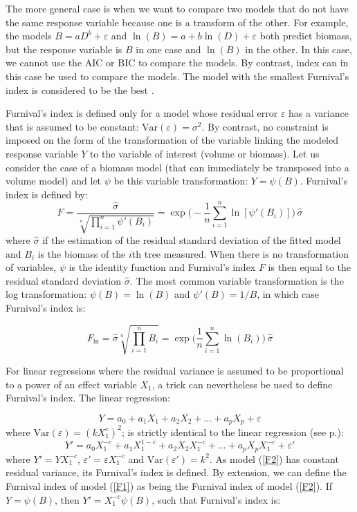 The more general case is when we want to compare two models that do not have the same response variable because one is a transform of the other. For example, the models $B=aD^b+\varepsilon$ and $\ln(B)=a+b\ln(D)+\varepsilon$ both predict biomass, but the response variable is $B$ in one case and $\ln(B)$ in the other. In this case, we cannot use the AIC or BIC to compare the models. By contrast, \citet{furnival61} index can in this case be used to compare the models. The model with the smallest Furnival's index is considered to be the best \citep{parresol99}.

Furnival's index is defined only for a model whose residual error $\varepsilon$ has a variance that is assumed to be constant: $\mbox{Var}(\varepsilon)=\sigma^2$. By contrast, no constraint is imposed on the form of the transformation of the variable linking the modeled response variable $Y$ to the variable of interest (volume or biomass). Let us consider the case of a biomass model (that can immediately be transposed into a volume model) and let $\psi$ be this variable transformation: $Y=\psi(B)$. Furnival's index is defined by:
\[
F=\frac{\hat{\sigma}}{\sqrt[n]{\prod_{i=1}^n\psi'(B_i)}}
=\exp\Big(-\frac{1}{n}\sum_{i=1}^n\ln[\psi'(B_i)]\Big)\,\hat{\sigma}
\]
where $\hat{\sigma}$ if the estimation of the residual standard deviation of the fitted model and $B_i$ is the biomass of the $i$th tree measured. When there is no transformation of variables, $\psi$ is the identity function and Furnival's index $F$ is then equal to the residual standard deviation $\hat{\sigma}$. The most common variable transformation is the log transformation:
$\psi(B)=\ln(B)$ and $\psi'(B)=1/B$, in which case Furnival's index is:

\[
F_{\ln}=\hat{\sigma}\sqrt[n]{\textstyle\prod_{i=1}^nB_i}
=\exp\Big(\frac{1}{n}\sum_{i=1}^n\ln(B_i)\Big)\,\hat{\sigma}
\]

For linear regressions where the residual variance is assumed to be proportional to a power of an effect variable $X_1$, a trick can nevertheless be used to define Furnival's index. The linear regression:

\begin{equation}
Y=a_0+a_1X_1+a_2X_2+\ldots+a_pX_p+\varepsilon\label{F1}
\end{equation}
where $\mbox{Var}(\varepsilon)=(kX_1^c)^2$; is strictly identical to the linear regression (see p.\pageref{apart}):
\begin{equation}
Y'=a_0X_1^{-c}+a_1X_1^{1-c}+a_2X_2X_1^{-c}+\ldots+
a_pX_pX_1^{-c}+\varepsilon'\label{F2}
\end{equation}
where $Y'=YX_1^{-c}$, $\varepsilon'=\varepsilon X_1^{-c}$ and
$\mbox{Var}(\varepsilon')=k^2$. As model (\ref{F2}) has constant residual variance, its Furnival's index is defined.
By extension, we can define the Furnival index of model (\ref{F1}) as being the Furnival index of model (\ref{F2}). If $Y=\psi(B)$, then $Y'=X_1^{-c}\psi(B)$, such that Furnival's index is:

